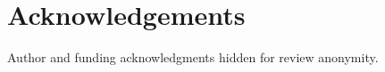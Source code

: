 \documentclass{sig-alternate}
\newcommand{\todo}[1]{\textcolor{cyan}{\textbf{[#1]}}}
\newif\ifisnopii
\begin{document}

\section*{Acknowledgements}

\ifisnopii %
\todo{put information in here}
\else %
Author and funding acknowledgments hidden for review anonymity.
\fi %









\balance


\end{document}
